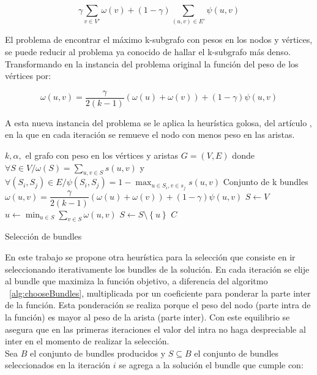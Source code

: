 \begin{equation}
\gamma \sum_{v \in V'}{\omega(v)} + (1 - \gamma) \sum_{(u,v) \in E'}{\psi(u,v)}
\end{equation}

El problema de encontrar el máximo k-subgrafo con pesos en los nodos y vértices, se puede reducir al problema ya conocido de hallar el k-subgrafo más denso\cite{SubgraphProblem}. Transformando en la instancia del problema original la función del peso de los vértices por:
 
\begin{equation}
\omega(u,v) = \dfrac{\gamma}{2( k - 1)} (\omega(u) + \omega(v)) + (1 - \gamma)\psi(u,v) 
\end{equation}

A esta nueva instancia del problema se le aplica la heurística golosa, del artículo \cite{compositeRetrival}, en la que en cada iteración se remueve el nodo con menos peso en las aristas.\\

\begin{algorithm}[H]
\begin{algorithmic}[1]
\REQUIRE $k,\alpha,$ el grafo con peso en los vértices y aristas  $G=(V,E)$ donde $\forall S \in V / \omega(S) = \sum_{u,v \in S}{s(u,v)}$ y $\forall (S_i,S_j) \in E / \psi(S_i,S_j) = 1 - \max_{u \in S_i, v \in s_j}{s(u,v)}$
\ENSURE Conjunto de k bundles
\STATE $\omega(u,v) = \dfrac{\gamma}{2( k - 1)} (\omega(u) + \omega(v)) + (1 - \gamma)\psi(u,v)$
\STATE $S \leftarrow V$
\STATE $u \leftarrow \min_{u \in S}{\sum_{v \in S}{\omega(u,v)}}$
\STATE $S \leftarrow S \setminus  \left\{u\right\} $
\ENDWHILE
\RETURN $C$
\end{algorithmic}
\caption{Selección de bundles}\label{alg:chooseBundles}
\end{algorithm}

En este trabajo se propone otra heurística para la selección que consiste en ir seleccionando iterativamente los bundles de la solución. En cada iteración se elije al bundle que maximiza la función objetivo, a diferencia del algoritmo ~\ref{alg:chooseBundles}, multiplicada por un coeficiente para ponderar la parte inter de la función. Esta ponderación se realiza porque el peso del nodo (parte intra de la función) es mayor al peso de la arista (parte inter). Con este equilibrio se asegura que en las primeras iteraciones el valor del intra no haga despreciable al inter en el momento de realizar la selección.\\
Sea $B$ el conjunto de bundles producidos y $S \subseteq B$ el conjunto de bundles seleccionados en la iteración $i$ se agrega a la solución el bundle que cumple con:


